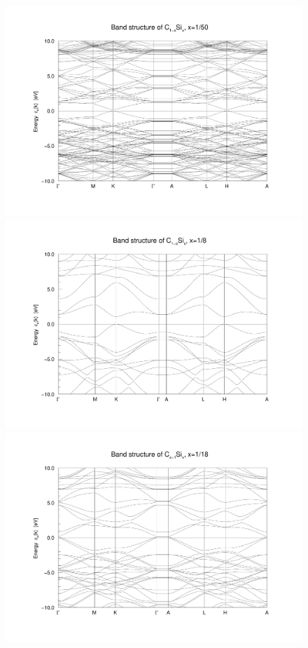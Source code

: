 \begin{figure}
\begin{minipage}[t]{0.9\textwidth}
						\includegraphics[width=\textwidth]{Results/Silicon/Silicon5/silicon5band.pdf}
					\end{minipage}
					\begin{minipage}[t]{0.3\textwidth}
						\includegraphics[width=\textwidth]{Results/Silicon/Silicon2/silicon2band.pdf}
					\end{minipage}
					\begin{minipage}[t]{0.3\textwidth}
						\includegraphics[width=\textwidth]{Results/Silicon/Silicon3/silicon3band.pdf}

\end{minipage}
\end{figure}
